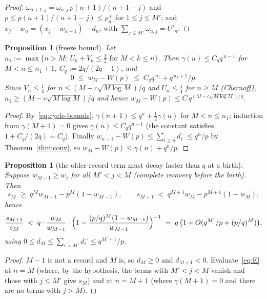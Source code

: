 \documentclass[11pt]{article}
\newtheorem{proposition}[theorem]{Proposition}
\theoremstyle{definition}
\begin{document}
\begin{proof}
  $\omega_{n+1,j}=\omega_{n,j}\,p(n+1)/(n+1-j)$ and
  $p\le p(n+1)/(n+1-j)\le\rho^+_n$ for $1\le j\le M'$; and
  $x_j-w_n=(x_j-w_{n-1})-d_n$, with $\sum_{j\le M'}\omega_{n,j}=U'_n$.
\end{proof}

\begin{proposition}[freeze bound]\label{prop:freeze}
  Let $n_1:=\max\{n>M:\ U_k+V_k\le\tfrac12\text{ for }M<k\le n\}$.  Then
  $\gamma(n)\le C_qq^{\,n-1}$ for $M<n\le n_1+1$, $C_q:=2q/(2q-1)$, and
  \[
    0\;\le\;w_M-W(p)\;\le\;C_qq^{\,n_1}+q^{\,n_1+1}/p .
  \]
  Since $V_n\le\tfrac14$ for $n\le(M-c\sqrt{M\log M})/q$ and
  $U_n\le\tfrac14$ for $n\ge M$ (Chernoff), $n_1\ge(M-c\sqrt{M\log M})/q$
  and hence $w_M-W(p)\le C\,q^{(M-c\sqrt{M\log M})/q}$.
\end{proposition}

\begin{proof}
  By~\eqref{eq:cycle-bounds}, $\gamma(n+1)\le q^n+\tfrac12\gamma(n)$ for
  $M<n\le n_1$; induction from $\gamma(M+1)=0$ gives
  $\gamma(n)\le C_qq^{n-1}$ (the constant satisfies
  $1+C_q/(2q)=C_q$).  Finally $w_{n-1}-W(p)\le\sum_{i\ge n}d_i^-\le q^n/p$
  by Theorem~\ref{thm:conv}, so $w_M-W(p)\le\gamma(n)+q^n/p$.
\end{proof}

\begin{proposition}[the older-record term must decay faster than $q$ at a birth]\label{prop:ratio}
  Suppose $w_{M-1}\ge w_j$ for all $M'<j<M$ (complete recovery before
  the birth).  Then
  \[
    s_M\;\ge\;q^Mw_{M-1}-p^M(1-w_{M-1}),\qquad
    s_{M+1}\;<\;q^{M+1}w_M-p^{M+1}(1-w_M),
  \]
  hence
  \[
    \frac{s_{M+1}}{s_M}\;<\;q\cdot\frac{w_M}{w_{M-1}}\cdot
    \Bigl(1-\frac{(p/q)^M(1-w_{M-1})}{w_{M-1}}\Bigr)^{-1}
    \;=\;q\,\bigl(1+O(q^{M'}/p+(p/q)^M)\bigr),
  \]
  using $0\le d_M\le\sum_{i>M'}d_i^-\le q^{M'+1}/p$.
\end{proposition}

\begin{proof}
  $M-1$ is not a record and $M$ is, so $d_M\ge0$ and $d_{M+1}<0$.
  Evaluate~\eqref{eq:E} at $n=M$ (where, by the hypothesis, the terms
  with $M'<j<M$ vanish and those with $j\le M'$ give $s_M$) and at
  $n=M+1$ (where $\gamma(M+1)=0$ and there are no terms with $j>M$).
\end{proof}
\end{document}
